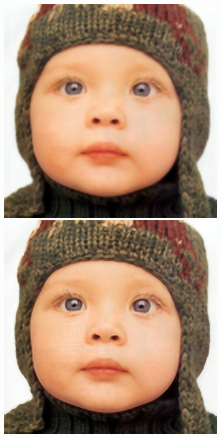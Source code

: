 \documentclass[runningheads]{llncs}
\begin{document}
\begin{figure}[t]
  \includegraphics[width=\mywidth]{set5_1_pix.png}
  \includegraphics[width=\mywidth]{set5_1_srcnn.png}

\end{figure}
\end{document}
